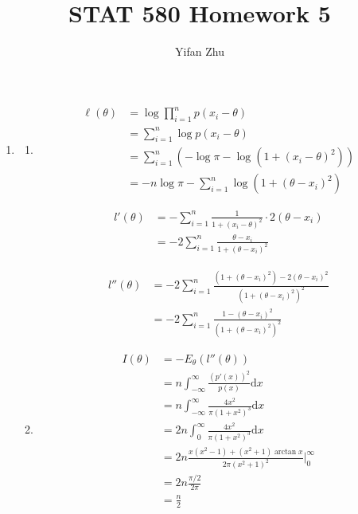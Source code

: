 \documentclass{article}
\begin{document}


	\title{STAT 580 Homework 5}
	\author{Yifan Zhu}
	\maketitle

	\begin{enumerate}[leftmargin = 0 em, label = \arabic*., font = \bfseries]
	\item
	\begin{enumerate}
		\item 
		\begin{align*}
	\ell (\theta) & = \log \prod_{i=1}^n p(x_i - \theta)\\
	& = \sum_{i=1}^n \log p(x_i - \theta)\\
	& = \sum_{i=1}^n \left( - \log \pi - \log(1 + (x_i - \theta)^2) \right)\\
	& =  -n \log \pi - \sum_{i=1}^{n} \log \left( 1 + (\theta - x_i)^2 \right) 
	\end{align*}

	\begin{align*}
	l'(\theta) & = - \sum_{i=1}^n \frac{1}{1 + (x_i - \theta)^2} \cdot 2 (\theta - x_i)\\
	& = - 2 \sum_{i=1}^n \frac{\theta - x_i}{1 + (\theta - x_i)^2}
	\end{align*}

	\begin{align*}
	l''(\theta) & = -2 \sum_{i=1}^n \frac{\left( 1 + (\theta - x_i)^2 \right) - 2 (\theta - x_i)^2 }{\left( 1 + (\theta - x_i)^2 \right)^2 }\\
	& = -2 \sum_{i=1}^n \frac{1 - (\theta - x_i)^2}{\left(1 + (\theta - x_i)^2\right)^2}
	\end{align*}
	\item 
	\begin{align*}
	I(\theta) & = - E_\theta (l''(\theta))\\
	& = n \int_{-\infty}^\infty \frac{(p'(x))^2}{p(x)} \mathrm{d}x\\
	& = n \int_{-\infty}^\infty \frac{4 x^2}{\pi (1 + x^2)^3} \mathrm{d}x\\
	& = 2n \int_0^\infty \frac{4 x^2}{\pi (1 + x^2)^3} \mathrm{d}x \\
	& = 2 n \frac{x (x^2 - 1) + (x^2 + 1) \arctan x}{2 \pi (x^2 + 1)^2} \bigg|_{0}^\infty\\
	& = 2 n \frac{\pi/2}{2 \pi} \\
	& = \frac{n}{2}
	\end{align*}


\end{enumerate}
\end{enumerate}
\end{document}
